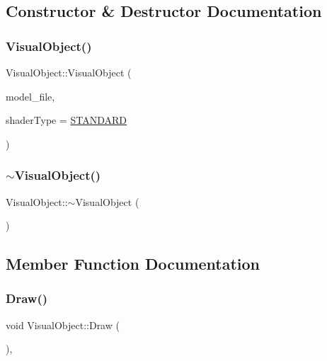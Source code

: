 \subsection{Constructor \& Destructor Documentation}
\mbox{\label{class_visual_object_acae4022cf0fa793dfba4ea5a91b9d242}} 
\subsubsection{\texorpdfstring{VisualObject()}{VisualObject()}}
{\footnotesize\ttfamily Visual\+Object\+::\+Visual\+Object (\begin{DoxyParamCaption}\item[{G\+Lchar $\ast$}]{model\+\_\+file,  }\item[{\mbox{\hyperlink{_game_object_8h_a6230e1b9ecbf2d82d10856fd7e1fde46}{Shader\+Type}}}]{shader\+Type = {\ttfamily \mbox{\hyperlink{_texture_8h_a65468556d79304b3a4bfc464cc12e549a94e94133f4bdc1794c6b647b8ea134d0}{S\+T\+A\+N\+D\+A\+RD}}} }\end{DoxyParamCaption})}

\mbox{\label{class_visual_object_a068ba11545322d81d9ad8c675c4233f9}} 
\subsubsection{\texorpdfstring{$\sim$VisualObject()}{~VisualObject()}}
{\footnotesize\ttfamily Visual\+Object\+::$\sim$\+Visual\+Object (\begin{DoxyParamCaption}{ }\end{DoxyParamCaption})}



\subsection{Member Function Documentation}
\mbox{\label{class_visual_object_a10c0e01e375fd4af08e57f3475dd312c}} 
\subsubsection{\texorpdfstring{Draw()}{Draw()}}
{\footnotesize\ttfamily void Visual\+Object\+::\+Draw (\begin{DoxyParamCaption}{ }\end{DoxyParamCaption})\hspace{0.3cm}{\ttfamily [override]}, {\ttfamily [virtual]}}



